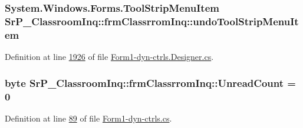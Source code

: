 \hypertarget{class_sr_p___classroom_inq_1_1frm_classrrom_inq_a8163a2e440678bc9508520209879805e}{
\subsubsection[{undo\-Tool\-Strip\-Menu\-Item}]{\setlength{\rightskip}{0pt plus 5cm}\-System.\-Windows.\-Forms.\-Tool\-Strip\-Menu\-Item {\bf \-Sr\-P\-\_\-\-Classroom\-Inq\-::frm\-Classrrom\-Inq\-::undo\-Tool\-Strip\-Menu\-Item}}}
\label{class_sr_p___classroom_inq_1_1frm_classrrom_inq_a8163a2e440678bc9508520209879805e}


\-Definition at line \hyperlink{_form1-dyn-ctrls_8_designer_8cs_source_l01926}{1926} of file \hyperlink{_form1-dyn-ctrls_8_designer_8cs_source}{\-Form1-\/dyn-\/ctrls.\-Designer.\-cs}.

\hypertarget{class_sr_p___classroom_inq_1_1frm_classrrom_inq_a9978aff45fb1057f102e224f8485f096}{
\subsubsection[{\-Unread\-Count}]{\setlength{\rightskip}{0pt plus 5cm}byte {\bf \-Sr\-P\-\_\-\-Classroom\-Inq\-::frm\-Classrrom\-Inq\-::\-Unread\-Count} = 0}}
\label{class_sr_p___classroom_inq_1_1frm_classrrom_inq_a9978aff45fb1057f102e224f8485f096}


\-Definition at line \hyperlink{_form1-dyn-ctrls_8cs_source_l00089}{89} of file \hyperlink{_form1-dyn-ctrls_8cs_source}{\-Form1-\/dyn-\/ctrls.\-cs}.


